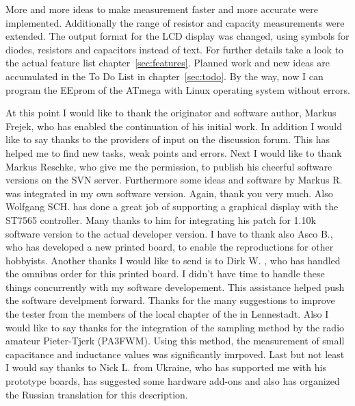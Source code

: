 More and more ideas to make measurement faster and more accurate were implemented.
Additionally the range of resistor and capacity measurements were extended.
The output format for the LCD display was changed, using symbols for diodes, resistors and capacitors instead of text.
For further details take a look to the actual feature list chapter~\ref{sec:features}.
Planned work and new ideas are accumulated in the To Do List in chapter~\ref{sec:todo}.
By the way, now I can program the EEprom of the ATmega with Linux operating system without errors.

At this point I would like to thank the originator and software author, Markus Frejek, who has enabled the continuation
of his initial work.
In addition I would like to say thanks to the providers of input on the discussion forum. This has helped me to
find new tasks, weak points and errors.
Next I would like to thank Markus Reschke, who give me the permission, to publish his cheerful software versions on the
SVN server. Furthermore some ideas and software by Markus R. was integrated in my own software version.
Again, thank you very much.
Also Wolfgang SCH. has done a great job of supporting a graphical display with the ST7565 controller. Many thanks to him
for integrating his patch for 1.10k software version to the actual developer version.
I have to thank also Asco B., who has developed a new printed board, to enable the reproductions for other hobbyists.
Another thanks I would like to send is to Dirk W. , who has handled the omnibus order for this printed board.
I didn't have time to handle these things concurrently with my software developement. This assistance helped push the
software develpment forward.
Thanks for the many suggestions to improve the tester from the members of the local chapter of the 
in Lennestadt.
Also I would like to say thanks for the integration of the sampling method by the radio amateur Pieter-Tjerk (PA3FWM).
Using this method, the measurement of small capacitance and inductance values was significantly imrpoved.
Last but not least I would say thanks to Nick L. from Ukraine, who has supported me with his prototype boards, 
has suggested some hardware add-ons and also has organized the Russian translation for this description.

